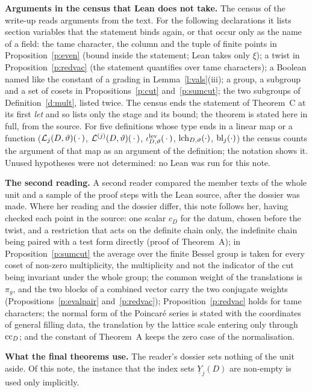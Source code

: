 \documentclass[11pt,a4paper]{article}
\newcommand{\m}[1]{\mbox{$#1$}}        %
\newcommand{\subhead}[1]{\par\addvspace{9pt plus 2pt}\Needspace{4\baselineskip}\noindent\textbf{#1}\enspace\ignorespaces}
\theoremstyle{plainx}
\theoremstyle{uprightx}
\newcommand{\YI}[2]{\underline{Y}_{#2}(#1)}        %
\newcommand{\cD}[1]{c_{#1}}                         %
\begin{document}
\subhead{Arguments in the census that Lean does not take.} The census of the write-up reads arguments from the
text. For the following declarations it lists section variables that the statement binds again, or that occur
only as the name of a field: the tame character, the column and the tuple of finite points in
Proposition~\ref{p:even} (bound inside the statement; Lean takes only $\xi$); a twist in Proposition~\ref{p:redvac}
(the statement quantifies over tame characters); a Boolean named like the constant of a grading in
Lemma~\ref{l:vals}(iii); a group, a subgroup and a set of cosets in Propositions~\ref{p:cut} and~\ref{p:sumcut};
the two subgroups of Definition~\ref{d:mult}, listed twice. The census ends the statement of Theorem~C at its first
\emph{let} and so lists only the stage and its bound; the theorem is stated here in full, from the source. For five
definitions whose type ends in a linear map or a function (\m{\liftY{\vartheta}{j}{(\,\cdot\,)}},
\m{\chainY{\vartheta}{j}{(\,\cdot\,)}}, \m{\iotL{\vartheta}{(\,\cdot\,)}}, \m{\lastChar{\vartheta}{\cdot}},
\m{\blk{j}{\cdot}}) the census counts the argument of that map as an argument of the definition; the notation shows
it. Unused hypotheses were not determined: no Lean was run for this note.

\subhead{The second reading.} A second reader compared the member texts of the whole unit and a sample of the proof
steps with the Lean source, after the dossier was made. Where her reading and the dossier differ, this note
follows her, having checked each point in the source: one scalar $\cD{D}$ for the datum, chosen before the twist, and a
restriction that acts on the definite chain only, the indefinite chain being paired with a test form directly
(proof of Theorem~A); in Proposition~\ref{p:sumcut} the average over the finite Bessel group is taken for every coset
of non-zero multiplicity, the multiplicity and not the indicator of the cut being invariant under the whole
group; the common weight of the translations is $\pi_g$, and the two blocks of a combined vector carry the two
conjugate weights (Propositions~\ref{p:evalpair} and~\ref{p:redvac}); Proposition~\ref{p:redvac} holds for tame
characters; the normal form of the Poincar\'e series is stated with the coordinates of general filling data, the
translation by the lattice scale entering only through $\operatorname{cc}_{D}$; and the constant of Theorem~A keeps the zero
case of the normalisation.

\subhead{What the final theorems use.} The reader's dossier sets nothing of the unit aside. Of this note, the
instance that the index sets $\YI{D}{j}$ are non-empty is used only implicitly.
\end{document}
